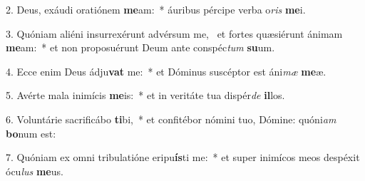 2. Deus, exáudi oratiónem \textbf{me}am:~*  áuribus pércipe verba o\textit{ris} \textbf{me}i.\

3. Quóniam aliéni insurrexérunt advérsum me, \dag\  et fortes quæsiérunt ánimam \textbf{me}am:~*  et non proposuérunt Deum ante conspéc\textit{tum} \textbf{su}um.\

4. Ecce enim Deus ádju\textbf{vat} me:~*  et Dóminus suscéptor est áni\textit{mæ} \textbf{me}æ.\

5. Avérte mala inimícis \textbf{me}is:~*  et in veritáte tua dispér\textit{de} \textbf{il}los.\

6. Voluntárie sacrificábo \textbf{ti}bi,~*  et confitébor nómini tuo, Dómine: quóni\textit{am} \textbf{bo}num est:\

7. Quóniam ex omni tribulatióne eripu\textbf{ís}ti me:~*  et super inimícos meos despéxit ócu\textit{lus} \textbf{me}us.\

